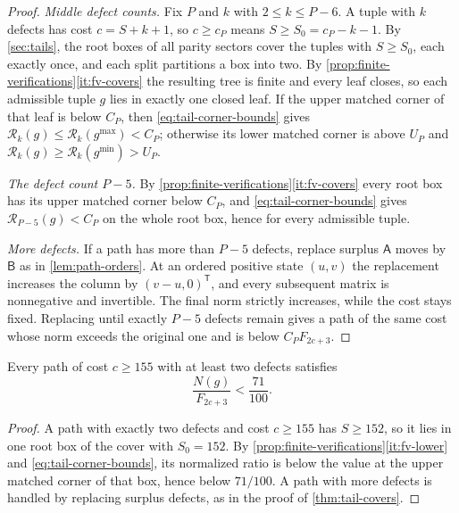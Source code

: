 \begin{proof}
\emph{Middle defect counts.} Fix $P$ and $k$ with $2\leqslant k\leqslant P-6$.
A tuple with $k$ defects has cost $c=S+k+1$, so $c\geqslant c_P$ means
$S\geqslant S_0=c_P-k-1$. By \cref{sec:tails}, the root boxes of all parity
sectors cover the tuples with $S\geqslant S_0$, each exactly once, and each
split partitions a box into two. By \cref{prop:finite-verifications}\ref{it:fv-covers} the resulting tree is
finite and every leaf closes, so each admissible tuple $g$ lies in exactly one
closed leaf. If the upper matched corner of that leaf is below $C_P$, then
\eqref{eq:tail-corner-bounds} gives
$\mathcal R_k(g)\leqslant\mathcal R_k(g^{\max})<C_P$; otherwise its lower
matched corner is above $U_P$ and
$\mathcal R_k(g)\geqslant\mathcal R_k(g^{\min})>U_P$.

\emph{The defect count $P-5$.} By \cref{prop:finite-verifications}\ref{it:fv-covers} every
root box has its upper matched corner below $C_P$, and
\eqref{eq:tail-corner-bounds} gives $\mathcal R_{P-5}(g)<C_P$ on the whole
root box, hence for every admissible tuple.

\emph{More defects.} If a path has more than $P-5$ defects, replace surplus
$\mathsf A$ moves by $\mathsf B$ as in \cref{lem:path-orders}. At an
ordered positive state $(u,v)$ the replacement increases the column by
$(v-u,0)^{\mathsf T}$, and every subsequent matrix is nonnegative and
invertible. The final norm strictly increases, while the cost stays fixed.
Replacing until exactly $P-5$ defects remain gives a path of the same cost
whose norm exceeds the original one and is below $C_PF_{2c+3}$.
\end{proof}

\begin{corollary}
\label{cor:tail-lower-cost}
Every path of cost $c\geqslant155$ with at least two defects satisfies
$$
 \frac{N(g)}{F_{2c+3}}<\frac{71}{100}.
$$
\end{corollary}

\begin{proof}
A path with exactly two defects and cost $c\geqslant155$ has $S\geqslant152$,
so it lies in one root box of the cover with $S_0=152$. By
\cref{prop:finite-verifications}\ref{it:fv-lower} and \eqref{eq:tail-corner-bounds}, its
normalized ratio is below the value at the upper matched corner of that box,
hence below $71/100$. A path with more defects is handled by replacing
surplus defects, as in the proof of \cref{thm:tail-covers}.
\end{proof}

